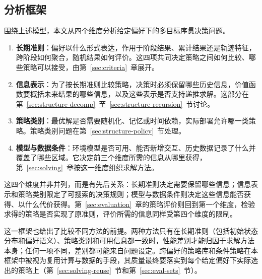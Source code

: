 \subsection{分析框架}\label{sec:framework-dimensions}

围绕上述模型，本文从四个维度分析给定偏好下的多目标序贯决策问题。

\begin{enumerate}
\item \textbf{长期准则}：偏好以什么形式表达，作用于阶段结果、累计结果还是轨迹特征，跨阶段如何聚合，随机结果如何评价。这四项共同决定策略之间如何比较、哪些策略可以接受，由第~\ref{sec:criteria}~章展开。
\item \textbf{信息表示}：为了按长期准则比较策略，决策时必须保留哪些历史信息，价值函数要概括未来结果的哪些信息，以及这些表示是否支持递推求解。这部分在第~\ref{sec:structure-decomp}~至~\ref{sec:structure-recursion}~节讨论。
\item \textbf{策略类别}：最优解是否需要随机化、记忆或时间依赖，实际部署允许哪一类策略。策略类别问题在第~\ref{sec:structure-policy}~节处理。
\item \textbf{模型与数据条件}：环境模型是否可用、能否新增交互、历史数据记录了什么并覆盖了哪些区域。它决定前三个维度所需的信息从哪里获得，第~\ref{sec:solving}~章按这一维度组织求解方法。
\end{enumerate}

这四个维度并非并列，而是有先后关系：长期准则决定需要保留哪些信息；信息表示和策略类别限定了可搜索的决策规则；模型与数据条件则决定这些信息能否获得、以什么代价获得。第~\ref{sec:evaluation}~章的策略评价则回到第一个维度，检验求得的策略是否实现了原准则，评价所需的信息同样受第四个维度的限制。


这一框架也给出了比较不同方法的前提。两种方法只有在长期准则（包括初始状态分布和偏好语义）、策略类别和可用信息都一致时，性能差别才能归因于求解方法本身；任何一项不同，差别都可能来自问题设定。跨偏好的策略库和条件策略在本框架中被视为复用计算与数据的手段，其质量最终要落实到每个给定偏好下实际选出的策略上（第~\ref{sec:solving-reuse}~节和第~\ref{sec:eval-sets}~节）。
